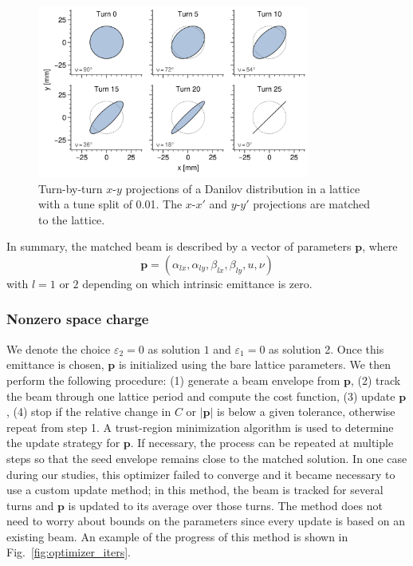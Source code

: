 %
\begin{figure}[!p]
    \centering
    \vspace*{2cm}
    \includegraphics[width=0.8\textwidth]{Images/chapter2/splittunes_tbt.png}
    \caption{Turn-by-turn $x$-$y$ projections of a Danilov distribution in a lattice with a tune split of 0.01. The $x$-$x'$ and $y$-$y'$ projections are matched to the lattice.}
    \label{fig:splittunes_tbt}
    \vspace*{2cm}
\end{figure}
%
In summary, the matched beam is described by a vector of parameters $\mathbf{p}$, where
%
\begin{equation} \label{eq:twiss_params_4D}
    \mathbf{p} = (\alpha_{lx}, \alpha_{ly}, \beta_{lx}, \beta_{ly}, u, \nu)
\end{equation}
%
with $l = 1$ or $2$ depending on which intrinsic emittance is zero.



\subsubsection{Nonzero space charge}

We denote the choice $\varepsilon_2 = 0$ as solution $1$ and $\varepsilon_1 = 0$ as solution 2. Once this emittance is chosen, $\mathbf{p}$ is initialized using the bare lattice parameters. We then perform the following procedure: (1) generate a beam envelope from $\mathbf{p}$, (2) track the beam through one lattice period and compute the cost function, (3) update $\mathbf{p}$, (4) stop if the relative change in $C$ or $|\mathbf{p}|$ is below a given tolerance, otherwise repeat from step 1. A trust-region minimization algorithm \cite{Branch1999} is used to determine the update strategy for $\mathbf{p}$. If necessary, the process can be repeated at multiple steps so that the seed envelope remains close to the matched solution. In one case during our studies, this optimizer failed to converge and it became necessary to use a custom update method; in this method, the beam is tracked for several turns and $\mathbf{p}$ is updated to its average over those turns. The method does not need to worry about bounds on the parameters since every update is based on an existing beam. An example of the progress of this method is shown in Fig.~\ref{fig:optimizer_iters}. 

